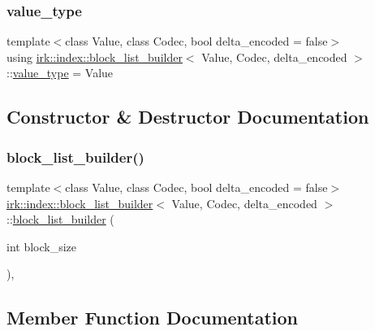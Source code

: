 \subsubsection{\texorpdfstring{value\+\_\+type}{value\_type}}
{\footnotesize\ttfamily template$<$class Value, class Codec, bool delta\+\_\+encoded = false$>$ \\
using \mbox{\hyperlink{classirk_1_1index_1_1block__list__builder}{irk\+::index\+::block\+\_\+list\+\_\+builder}}$<$ Value, Codec, delta\+\_\+encoded $>$\+::\mbox{\hyperlink{classirk_1_1index_1_1block__list__builder_aee4746d79079e00283a5f7a3ad071b5e}{value\+\_\+type}} =  Value}



\subsection{Constructor \& Destructor Documentation}
\mbox{\label{classirk_1_1index_1_1block__list__builder_a7d34ddbad0ae90c5623689f194e21571}} 
\subsubsection{\texorpdfstring{block\+\_\+list\+\_\+builder()}{block\_list\_builder()}}
{\footnotesize\ttfamily template$<$class Value, class Codec, bool delta\+\_\+encoded = false$>$ \\
\mbox{\hyperlink{classirk_1_1index_1_1block__list__builder}{irk\+::index\+::block\+\_\+list\+\_\+builder}}$<$ Value, Codec, delta\+\_\+encoded $>$\+::\mbox{\hyperlink{classirk_1_1index_1_1block__list__builder}{block\+\_\+list\+\_\+builder}} (\begin{DoxyParamCaption}\item[{int}]{block\+\_\+size }\end{DoxyParamCaption})\hspace{0.3cm}{\ttfamily [inline]}, {\ttfamily [explicit]}}



\subsection{Member Function Documentation}
\mbox{\label{classirk_1_1index_1_1block__list__builder_a689ecb66563dd8ccdfd26d103da377a3}} 
